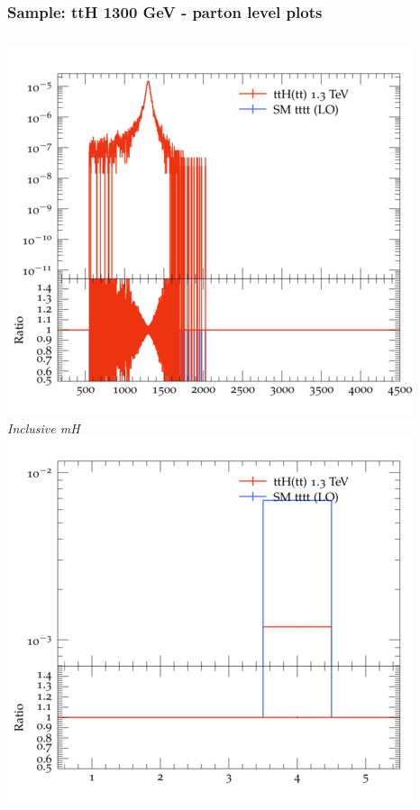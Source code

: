 \documentclass{beamer}
\begin{document}
\begin{frame}
\frametitle{Sample: ttH 1300 GeV - parton level plots}
\begin{columns}
\includegraphics[width=\textwidth]{../plots/ttH_1300/tttt_ttH/Inclusive_mH.png}\\
\textit{\small Inclusive mH}
\includegraphics[width=\textwidth]{../plots/ttH_1300/tttt_ttH/Inclusive_nTop.png}\\

\end{columns}
\end{frame}
\end{document}
